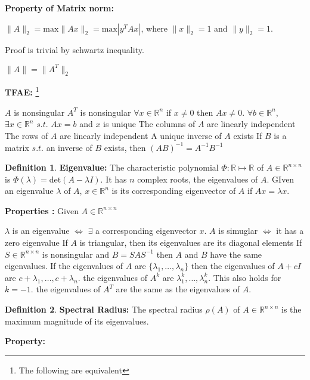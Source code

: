 \documentclass[titlepage]{article}
\theoremstyle{plain}
\theoremstyle{definition}
\newtheorem{defn}{Definition}[section]
\theoremstyle{remark}
\begin{document}
\noindent \textbf{Property of Matrix norm:}

$\|A\|_2 = \text{max}\|Ax\|_2 = \text{max}|y^TAx|$, where $\|x\|_2 = 1$ and $\|y\|_2
= 1$.

\indent \indent Proof is trivial by schwartz inequality.

$\|A\| = \|A^T\|_2$

\noindent
\textbf{TFAE: }\footnote{The following are equivalent}
\begin{outline}[enumerate]
\1 $A$ is nonsingular
\1 $A^T$ is nonsingular
\1 $\forall x \in \mathbb{R}^n$ if $x \not = 0$ then $Ax \not = 0$.
\1 $\forall b \in \mathbb{R}^n$, $\exists x \in \mathbb{R}^n$ $s.t.$ $Ax = b$
and $x$ is unique
\1 The columns of $A$ are linearly independent
\1 The rows of $A$ are linearly independent
\1 A unique inverse of $A$ exists
\1 If $B$ is a matrix $s.t.$ an inverse of $B$ exists, then $(AB)^{-1} = A^{-1}
B^{-1}$
\end{outline}
\begin{defn}
\textbf{Eigenvalue: } The characteristic polynomial $\Phi: \mathbb{R} \mapsto
\mathbb{R}$ of $A \in \mathbb{R}^{n\times n}$ is $\Phi(\lambda) = \text{det}(A -
\lambda I)$. It has $n$ complex roots, the eigenvalues of $A$. GIven an
eigenvalue $\lambda$ of $A$, $x \in \mathbb{R}^n$ is its corresponding
eigenvector of $A$ if $Ax = \lambda x$.
\end{defn}

\noindent \textbf{Properties : } Given $A \in \mathbb{R}^{n \times n}$
\begin{outline}[enumerate]
\1 $\lambda$ is an eigenvalue $\iff$ $\exists$ a corresponding eigenvector $x$.
\1 $A$ is simuglar $\iff$ it has a zero eigenvalue
\1 If $A$ is triangular, then its eigenvalues are its diagonal elements
\1 If $S \in \mathbb{R}^{n \times n}$ is nonsingular and $B = SAS^{-1}$ then $A$
and $B$ have the same eigenvalues.
\1 If the eigenvalues of $A$ are $\{\lambda_1,\hdots, \lambda_n\}$ then
\2 the eigenvalues of $A + c I$ are $c + \lambda_1, \hdots, c + \lambda_n$.
\2 the eigenvalues of $A^k$ are $\lambda_1^k,\hdots, \lambda_n^k$. This
also holds for $k = -1$.
\2 the eigenvalues of $A^T$ are the same as the eigenvalues of $A$.
\end{outline}

\begin{defn}
\textbf{Spectral Radius: } The spectral radius $\rho(A)$ of $A \in \mathbb{R}^{n
\times n}$ is the maximum magnitude of its eigenvalues.
\end{defn}
\noindent \textbf{Property: }
\end{document}
